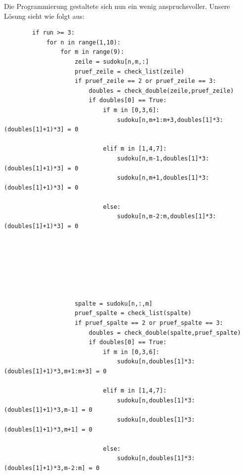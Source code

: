 \documentclass[11pt,a4paper]{article}
\begin{document}
Die Programmierung gestaltete sich nun ein wenig anspruchsvoller. Unsere Lösung sieht wie folgt aus:
\ \\
\begin{verbatim}
        if run >= 3:                                   
            for n in range(1,10):                      
                for m in range(9):                   
                    zeile = sudoku[n,m,:]                  
                    pruef_zeile = check_list(zeile)        
                    if pruef_zeile == 2 or pruef_zeile == 3: 
                        doubles = check_double(zeile,pruef_zeile) 
                        if doubles[0] == True:                   
                            if m in [0,3,6]:                                                    
                                sudoku[n,m+1:m+3,doubles[1]*3:(doubles[1]+1)*3] = 0
                            
                            elif m in [1,4,7]:
                                sudoku[n,m-1,doubles[1]*3:(doubles[1]+1)*3] = 0
                                sudoku[n,m+1,doubles[1]*3:(doubles[1]+1)*3] = 0
                            
                            else:
                                sudoku[n,m-2:m,doubles[1]*3:(doubles[1]+1)*3] = 0
                            
                            
                    
                    
                    
                    
                    
                    spalte = sudoku[n,:,m]              
                    pruef_spalte = check_list(spalte)   
                    if pruef_spalte == 2 or pruef_spalte == 3:     
                        doubles = check_double(spalte,pruef_spalte) 
                        if doubles[0] == True:
                            if m in [0,3,6]:                  
                                sudoku[n,doubles[1]*3:(doubles[1]+1)*3,m+1:m+3] = 0
                            
                            elif m in [1,4,7]:
                                sudoku[n,doubles[1]*3:(doubles[1]+1)*3,m-1] = 0
                                sudoku[n,doubles[1]*3:(doubles[1]+1)*3,m+1] = 0
                            
                            else:
                                sudoku[n,doubles[1]*3:(doubles[1]+1)*3,m-2:m] = 0    
\end{verbatim}
\ \\
\end{document}
